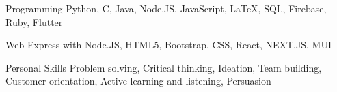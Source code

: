 


\begin{cvskills}


\cvskill
{Programming} %
{Python, C, Java, Node.JS, JavaScript, LaTeX, SQL, Firebase, Ruby, Flutter} %


\cvskill
{Web} %
{Express with Node.JS, HTML5, Bootstrap, CSS, React, NEXT.JS, MUI} %


\cvskill
{Personal Skills} %
{Problem solving, Critical thinking, Ideation, Team building, Customer orientation, Active learning and listening, Persuasion} %


\end{cvskills}